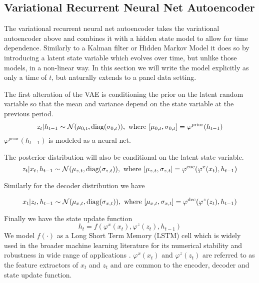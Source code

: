 \documentclass[12pt]{article}
\begin{document}
\subsection{Variational Recurrent Neural Net Autoencoder}

The variational recurrent neural net autoencoder takes the variational autoencoder above and combines it 
with a hidden state model to allow for time dependence. Similarly to a Kalman filter or Hidden 
Markov Model it does so by introducing a latent state variable which evolves over time, but unlike those models, in a non-linear way. 
In this section we will write the model explicitly as only a time of $t$, but naturally extends to a panel data setting. 

The first alteration of the VAE is conditioning the prior on the latent random variable so that the mean and 
variance depend on the state variable at the previous period. 
\begin{equation*}
   z_t | h_{t-1}\sim \operatorname{\mathcal{N}}(\mu_{0,t}, \text{diag}(\sigma_{0,t})), \text{ where } [\mu_{0,t}, \sigma_{0,t} ] = \varphi^{\text{prior}}(h_{t-1})
\end{equation*}
$\varphi^{\text{prior}}(h_{t-1})$ is modeled as a neural net. 

The posterior distribution will also be conditional on the latent state variable.
\begin{equation*}
   z_t |x_{t}, h_{t-1} \sim \operatorname{\mathcal{N}}(\mu_{z,t}, \text{diag}(\sigma_{z,t})), \text{ where } [\mu_{z,t}, \sigma_{z,t} ] = \varphi^{\text{enc}}(\varphi^{x}(x_t), h_{t-1})
\end{equation*}

Similarly for the decoder distribution we have 

\begin{equation*}
   x_t |z_t, h_{t-1} \sim \operatorname{\mathcal{N}}(\mu_{x,t}, \text{diag}(\sigma_{x,t})), \text{ where } [\mu_{x,t}, \sigma_{x,t} ] = \varphi^{\text{dec}}(\varphi^{z}(z_t), h_{t-1})
\end{equation*}

Finally we have the state update function
\begin{equation*}
   h_t = f(\varphi^{x}(x_t), \varphi^{z}(z_t), h_{t-1})
\end{equation*}
We model $f(\cdot)$ as a Long Short Term Memory (LSTM) cell which is widely used in the broader machine learning literature for 
its numerical stability and robustness in wide range of applications \citep{hoch/sepp:nc:1997}. 
$\varphi^{x}(x_t)$ and $\varphi^{z}(z_t)$ are referred to as the feature extractors of $x_t$ and $z_t$ and are common 
to the encoder, decoder and state update function. 
\end{document}
